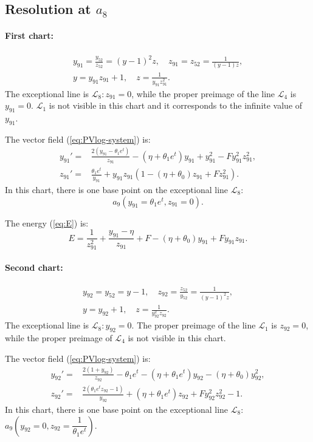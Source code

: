 \subsection{Resolution at $a_8$}\label{a8-blow}
\paragraph{First chart:}
\begin{gather*}
y_{91}=\frac{y_{52}}{z_{52}}=(y-1)^2z,
\quad
z_{91}=z_{52}=\frac1{(y-1)z},
\\
y=y_{91}z_{91}+1,
\quad
z=\frac1{y_{91}z_{91}^2}.
\end{gather*}
The exceptional line is $\mathcal{L}_8 : z_{91}=0$, while the proper preimage of the line $\mathcal{L}_{4}$ is $y_{91}=0$.
$\mathcal{L}_{1}$ is not visible in this chart and it corresponds to the infinite value of $y_{91}$.

The vector field  (\ref{eq:PVlog-system}) is:
$$
\begin{aligned}
y_{91}'=&
 \frac{2 (y_{91}-\theta_1 e^t)}{z_{91}}-(\eta+\theta_1 e^t) y_{91} + y_{91}^2  - F y_{91}^2 z_{91}^2
,
\\
z_{91}'=&
\frac{\theta_1 e^t}{y_{91}}+
y_{91} z_{91} (1 - (\eta+\theta_0) z_{91} + F z_{91}^2)
.
\end{aligned}
$$
In this chart, there is one base point on the exceptional line $\mathcal{L}_8$:
$$
a_9(y_{91}=\theta_1 e^t,z_{91}=0).
$$

The energy (\ref{eq:E}) is:
$$
E=
\frac{1}{z_{91}^2}
+\frac{y_{91}-\eta}{z_{91}}
+F
-(\eta+\theta_0) y_{91}
+F y_{91} z_{91}
.
$$


\paragraph{Second chart:}
\begin{gather*}
y_{92}=y_{52}=y-1,
\quad
z_{92}=\frac{z_{52}}{y_{52}}=\frac{1}{(y-1)^2z},
\\
y=y_{92}+1,
\quad
z=\frac{1}{y_{92}^2z_{92}}.
\end{gather*}
The exceptional line is $\mathcal{L}_8 : y_{92}=0$. The proper preimage of the line $\mathcal{L}_{1}$ is $z_{92}=0$, while the proper preimage of $\mathcal{L}_{4}$ is not visible in this chart. 

The vector field  (\ref{eq:PVlog-system}) is:
$$
\begin{aligned}
y_{92}'=&
\frac{ 2(1+ y_{92})}{z_{92}}-\theta_1 e^t
-(\eta+\theta_1 e^t) y_{92} - (\eta + \theta_0) y_{92}^2 
,
\\
z_{92}'=&
 \frac{2(\theta_1 e^t z_{92}-1)}{y_{92}} + (\eta + \theta_1 e^t) z_{92} + F y_{92}^2 z_{92}^2-1 
.
\end{aligned}
$$
In this chart, there is one base point on the exceptional line $\mathcal{L}_8$: $a_9\left(y_{92}=0,z_{92}=\dfrac{1}{\theta_1 e^t}\right)$.

